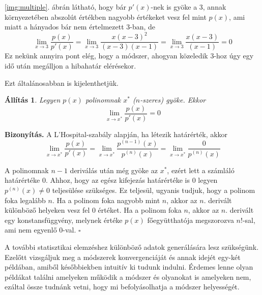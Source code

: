 \documentclass[a4paper,12pt]{report}
\newtheorem{All}[Tet]{Állítás}
\newenvironment{Biz}{\noindent \textbf{Bizonyítás. }}{ $\square$}
\begin{document}
			\ref{img:multiple}. ábrán látható, hogy bár $p'(x)$-nek is gyöke a $3$, annak környezetében abszolút értékben nagyobb értékeket vesz fel mint $p(x)$, ami miatt a hányados bár nem értelmezett $3$-ban, de \[\lim_{x\to3}\frac{p(x)}{p'(x)}=\lim_{x\to3}\frac{x(x-3)^2}{(x-3)(x-1)}=\lim_{x\to3}\frac{x(x-3)}{(x-1)}=0\]
				Ez nekünk annyira pont elég, hogy a módszer, ahogyan közeledik $3$-hoz úgy egy idő után megálljon a hibahatár elérésekor.

                               Ezt általánosabban is kijelenthetjük. \begin{All}\label{tartnullahoz}Legyen $p(x)$ polinomnak $x^*$ ($n$-szeres) gyöke. Ekkor
                \[\lim_{x\to x^*}\frac{p(x)}{p'(x)}=0\]
                \end{All}
                \begin{Biz}
                A L'Hospital-szabály alapján, ha létezik határérték, akkor
                \[\lim_{x\to x^*}\frac{p(x)}{p'(x)}=\lim_{x \to x^*}\frac{p^{(n-1)}(x)}{p^{(n)}(x)}=\lim_{x \to x^*}\frac{0}{p^{(n)}(x)}\]

				A polinomnak $n-1$ deriválás után még gyöke az $x^*$, ezért lett a számláló határértéke $0$. Ahhoz, hogy az egész kifejezás határértéke is $0$ legyen $p^{(n)}(x)\neq 0$ teljesülése szükséges. Ez teljesül, ugyanis tudjuk, hogy a polinom foka legalább $n$. Ha a polinom foka nagyobb mint $n$, akkor az $n.$ derivált különböző helyeken vesz fel 0 értéket. Ha a polinom foka $n$, akkor az $n.$ derivált egy konstansfüggvény, melynek értéke $p(x)$ főegyütthatója megszorozva $n!$-sal, ami nem egyenlő 0-val.
                \end{Biz}

				A további statisztikai elemzéshez különböző adatok generálására lesz szükségünk. Ezelőtt vizsgáljuk meg a módszerek konvergenciáját és annak idejét egy-két példában, amiből későbbiekben intuitív ki tudunk indulni. Érdemes lenne olyan példákat találni amelyeken működik a módszer és olyanokat is amelyeken nem, ezáltal össze tudnánk vetni, hogy mi befolyásolhatja a módszer helyességét.











\end{document}

